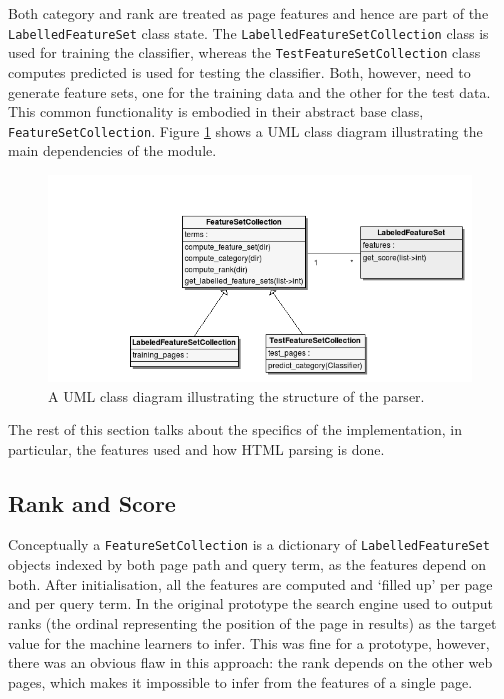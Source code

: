 \documentclass[12pt,notitlepage,twoside]{scrreprt}
\begin{document}
Both category and rank are treated as page features and hence are part of the
\texttt{LabelledFeatureSet} class state.  The
\texttt{LabelledFeatureSetCollection} class is used for training the classifier,
whereas the \texttt{TestFeatureSetCollection} class computes predicted is used
for testing the classifier. Both, however, need to generate
feature sets, one for the training data and the other for the test data. This
common functionality is embodied in their abstract base class,
\texttt{FeatureSetCollection}. Figure \ref{uml} shows a UML class diagram
illustrating the main dependencies of the module.

\begin{figure}[h!]
\centering
\includegraphics[scale=0.5]{figs/uml.png}
\caption{A UML class diagram illustrating the structure of the parser.}
\label{uml}
\end{figure}

The rest of this section talks about the specifics of the implementation, in
particular, the features used and how HTML parsing is done.

\subsection{Rank and Score}
Conceptually a \texttt{FeatureSetCollection} is a dictionary of \texttt{LabelledFeatureSet}
objects indexed by both page path and query term, as the features depend on both. After initialisation, all
the features are computed and `filled up' per page and per query term.
In the original prototype the search engine used to output ranks (the ordinal representing the position of the
page in results) as the target value for the machine learners to infer. This was fine for
a prototype, however, there was an obvious flaw in this approach: the rank depends
on the other web pages, which makes it impossible to infer from the features of a single
page. 
\end{document}
